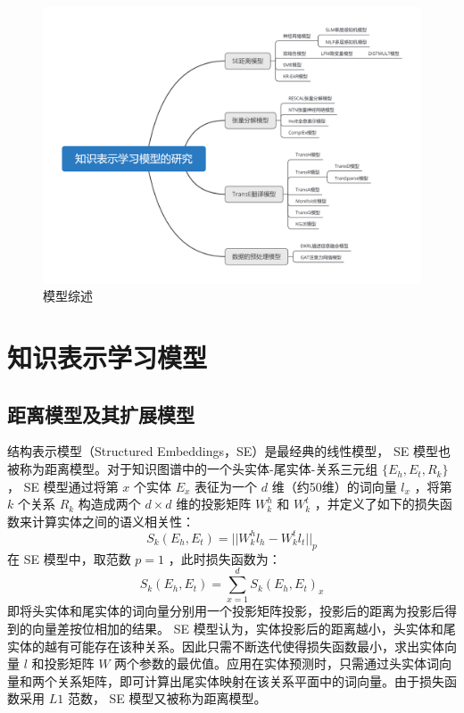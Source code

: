 \documentclass{llncs}
\begin{document}
\begin{figure}
	\centering
	\includegraphics[width=1\columnwidth]{figures/resume.png}
	\caption{模型综述}
	\label{fg:resume}
\end{figure}

\section{知识表示学习模型}

\subsection{距离模型及其扩展模型}

结构表示模型（Structured Embeddings，SE）\cite{DBLP:conf/aaai/BordesWCB11,DBLP:journals/corr/abs-1301-3618}是最经典的线性模型， SE 模型也被称为距离模型。对于知识图谱中的一个头实体-尾实体-关系三元组 $\{E_h, E_t, R_k\}$ ， SE 模型通过将第 $x$ 个实体 $E_x$ 表征为一个 $d$ 维（约50维）的词向量 $l_x$ ，将第 $k$ 个关系 $R_k$ 构造成两个 $d×d$ 维的投影矩阵 $W^h_k$ 和 $W^t_k$ ，并定义了如下的损失函数来计算实体之间的语义相关性：
\begin{displaymath}
S_k(E_h,E_t)=||W^h_kl_h-W^t_kl_t||_p
\end{displaymath}
在 SE 模型中，取范数 $p=1$ ，此时损失函数为：
\begin{displaymath}
S_k(E_h,E_t)=\sum_{x=1}^d{S_k(E_h,E_t)_x}
\end{displaymath}
即将头实体和尾实体的词向量分别用一个投影矩阵投影，投影后的距离为投影后得到的向量差按位相加的结果。 SE 模型认为，实体投影后的距离越小，头实体和尾实体的越有可能存在该种关系。因此只需不断迭代使得损失函数最小，求出实体向量 $l$ 和投影矩阵 $W$ 两个参数的最优值。应用在实体预测时，只需通过头实体词向量和两个关系矩阵，即可计算出尾实体映射在该关系平面中的词向量。由于损失函数采用 $L1$ 范数， SE 模型又被称为距离模型。
\end{document}
